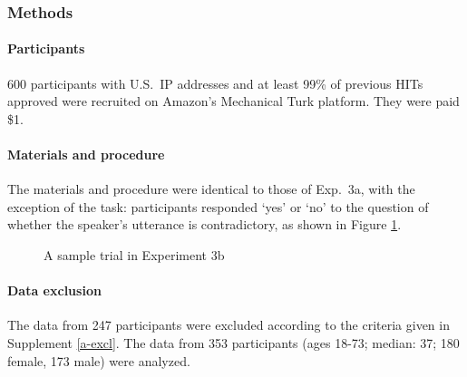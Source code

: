\documentclass[11pt,fleqn]{article}
\newcommand{\6}{\mbox{$[\hspace*{-.6mm}[$}}
\newcommand{\9}{\mbox{$]\hspace*{-.6mm}]$}}
\begin{document}
{\subsubsection{Methods}

\paragraph{Participants} 600 participants with U.S.\ IP addresses and at least 99\% of previous HITs approved were recruited on Amazon's Mechanical Turk platform. They were paid \$1.

\paragraph{Materials and procedure} The materials and procedure were identical to those of Exp.~3a, with the exception of the task: participants responded `yes' or `no' to the question of whether the speaker's utterance is contradictory, as shown in Figure \ref{fig-trial-exp3b}.

\begin{figure}[h!]
\begin{center}
\end{center}
\caption{A sample trial in Experiment 3b}\label{fig-trial-exp3b}
\end{figure}


\paragraph{Data exclusion} The data from 247 participants were excluded according to the criteria given in Supplement \ref{a-excl}. The data from 353 participants (ages 18-73; median: 37; 180 female, 173 male) were analyzed.
    


}
\end{document}
